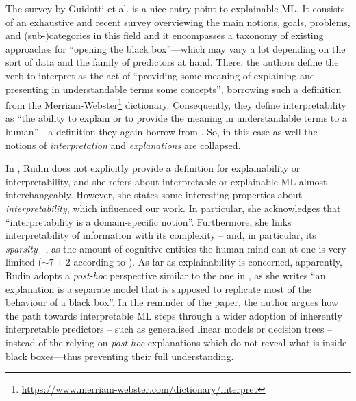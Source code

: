\documentclass[12pt,a4paper,openright,twoside]{book}
\begin{document}
The survey by Guidotti et al. \cite{GuidottiMRTGP19} is a nice entry point to explainable ML.
%
It consists of an exhaustive and recent survey overviewing the main notions, goals, problems, and (sub-)categories in this field and it encompasses a taxonomy of existing approaches for ``opening the black box''---which may vary a lot depending on the sort of data and the family of predictors at hand.
%
There, the authors define the verb to interpret as the act of ``providing some meaning of explaining and presenting in understandable terms some concepts'', borrowing such a definition from the Merriam-Webster\footnote{\url{https://www.merriam-webster.com/dictionary/interpret}} dictionary.
%
Consequently, they define interpretability as ``the ability to explain or to provide the meaning in understandable terms to a human''---a definition they again borrow from \cite{DoshiVelezK2017}.
%
So, in this case as well the notions of \emph{interpretation} and \emph{explanations} are collapsed.

In \cite{Rudin2019}, Rudin does not explicitly provide a definition for explainability or interpretability, and she refers about interpretable or explainable ML almost interchangeably.
%
However, she states some interesting properties about \emph{interpretability}, which influenced our work.
%
In particular, she acknowledges that ``interpretability is a domain-specific notion''.
%
Furthermore, she links interpretability of information with its complexity -- and, in particular, its \emph{sparsity} --, as the amount of cognitive entities the human mind can at one is very limited ($\sim 7 \pm 2$ according to \cite{numberseven-psyrev63}).
%
As far as explainability is concerned, apparently, Rudin adopts a \emph{post-hoc} perspective similar to the one in \cite{Lipton18}, as she writes ``an explanation is a separate model that is supposed to replicate most of the behaviour of a black box''.
%
In the reminder of the paper, the author argues how the path towards interpretable ML steps through a wider adoption of inherently interpretable predictors -- such as generalised linear models or decision trees -- instead of the relying on \emph{post-hoc} explanations which do not reveal what is inside black boxes---thus preventing their full understanding.
\end{document}
